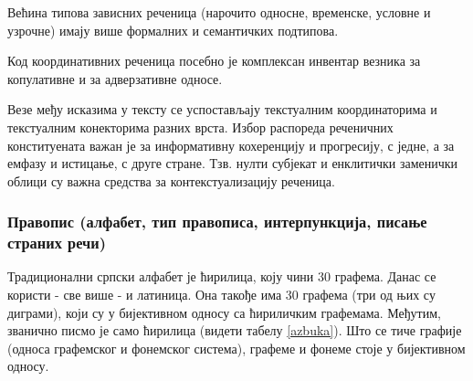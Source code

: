 \begin{multicols}{2}
Већина типова зависних реченица (нарочито односне, временске, условне и узрочне) имају више формалних и семантичких подтипова. 

Код координативних реченица посебно је комплексан инвентар везника за копулативне и за адверзативне односе.

Везе међу исказима у тексту се успостављају текстуалним координаторима и текстуалним конекторима разних врста. Избор распореда реченичних конституената важан је за информативну кохеренцију и прогресију, с једне, а за емфазу и истицање, с друге стране. Тзв. нулти субјекат и енклитички заменички облици су важна средства за контекстуализацију реченица.


\subsubsection {Правопис (алфабет, тип правописа, интерпункција, писање страних речи)}
  
Традиционални српски алфабет је ћирилица, коју чини 30 графема. Данас се користи - све више - и латиница. Она такође има 30 графема (три од њих су диграми), који су у бијективном односу са ћириличким графемама. Међутим, званично писмо је само ћирилица (видети табелу \ref{azbuka}).
Што се тиче графије (односа графемског и фонемског система), графеме и фонеме стоје  у бијективном односу.


\end{multicols}
